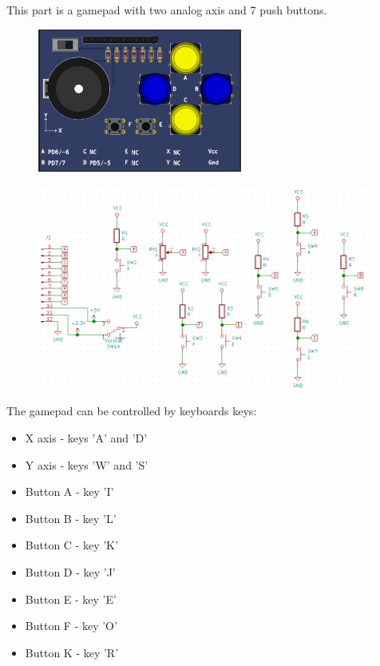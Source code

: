 This part is a gamepad with two analog axis and 7 push buttons.

\begin{figure}[H]
\center
\includegraphics[width=0.6\textwidth]{img/part_gamepad.png} 
\end{figure} 

\begin{figure}[H]
\center
\includegraphics[width=0.99\textwidth]{img/part_gamepad_.png} 
\end{figure} 

The gamepad can be controlled by keyboards keys:
\begin{itemize}
 \item X axis - keys 'A' and 'D'
 \item Y axis - keys 'W' and 'S'
 \item Button A - key 'I'
 \item Button B - key 'L'
 \item Button C - key 'K'
 \item Button D - key 'J'
 \item Button E - key 'E'
 \item Button F - key 'O'
 \item Button K - key 'R'
\end{itemize}


